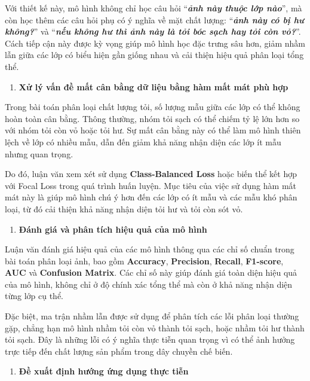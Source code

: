 \documentclass[
]{article}
\begin{document}
Với thiết kế này, mô hình không chỉ học câu hỏi ``\emph{\textbf{ảnh này
thuộc lớp nào}}'', mà còn học thêm các câu hỏi phụ có ý nghĩa về mặt
chất lượng: ``\emph{\textbf{ảnh này có bị hư không?}}'' và
``\emph{\textbf{nếu không hư thì ảnh này là tỏi bóc sạch hay tỏi còn
vỏ?}}''. Cách tiếp cận này được kỳ vọng giúp mô hình học đặc trưng sâu
hơn, giảm nhầm lẫn giữa các lớp có biểu hiện gần giống nhau và cải thiện
hiệu quả phân loại tổng thể.

\begin{enumerate}
\def\labelenumi{\alph{enumi}.}
\setcounter{enumi}{4}
\item
  \textbf{Xử lý vấn đề mất cân bằng dữ liệu bằng hàm mất mát phù hợp}
\end{enumerate}

Trong bài toán phân loại chất lượng tỏi, số lượng mẫu giữa các lớp có
thể không hoàn toàn cân bằng. Thông thường, nhóm tỏi sạch có thể chiếm
tỷ lệ lớn hơn so với nhóm tỏi còn vỏ hoặc tỏi hư. Sự mất cân bằng này có
thể làm mô hình thiên lệch về lớp có nhiều mẫu, dẫn đến giảm khả năng
nhận diện các lớp ít mẫu nhưng quan trọng.

Do đó, luận văn xem xét sử dụng \textbf{Class-Balanced Loss} hoặc biến
thể kết hợp với Focal Loss trong quá trình huấn luyện. Mục tiêu của việc
sử dụng hàm mất mát này là giúp mô hình chú ý hơn đến các lớp có ít mẫu
và các mẫu khó phân loại, từ đó cải thiện khả năng nhận diện tỏi hư và
tỏi còn sót vỏ.

\begin{enumerate}
\def\labelenumi{\alph{enumi}.}
\setcounter{enumi}{5}
\item
  \textbf{Đánh giá và phân tích hiệu quả của mô hình}
\end{enumerate}

Luận văn đánh giá hiệu quả của các mô hình thông qua các chỉ số chuẩn
trong bài toán phân loại ảnh, bao gồm \textbf{Accuracy},
\textbf{Precision}, \textbf{Recall}, \textbf{F1-score}, \textbf{AUC} và
\textbf{Confusion Matrix}. Các chỉ số này giúp đánh giá toàn diện hiệu
quả của mô hình, không chỉ ở độ chính xác tổng thể mà còn ở khả năng
nhận diện từng lớp cụ thể.

Đặc biệt, ma trận nhầm lẫn được sử dụng để phân tích các lỗi phân loại
thường gặp, chẳng hạn mô hình nhầm tỏi còn vỏ thành tỏi sạch, hoặc nhầm
tỏi hư thành tỏi sạch. Đây là những lỗi có ý nghĩa thực tiễn quan trọng
vì có thể ảnh hưởng trực tiếp đến chất lượng sản phẩm trong dây chuyền
chế biến.

\begin{enumerate}
\def\labelenumi{\alph{enumi}.}
\setcounter{enumi}{6}
\item
  \textbf{Đề xuất định hướng ứng dụng thực tiễn}
\end{enumerate}
\end{document}
